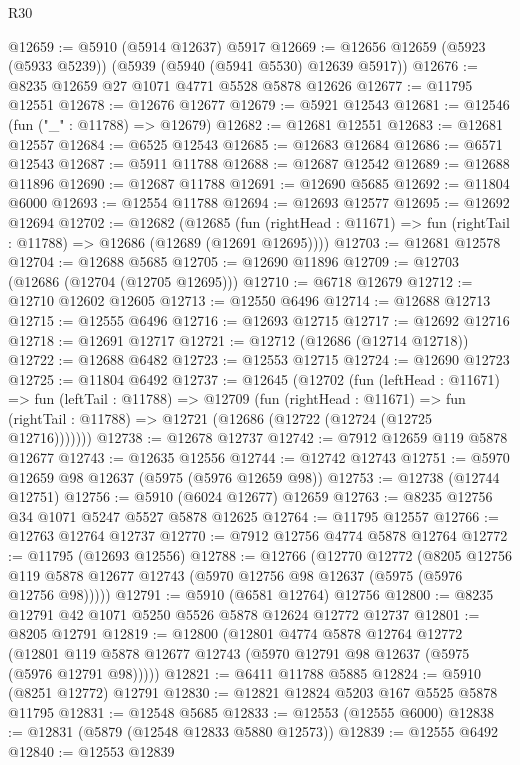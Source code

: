 \begin{lexlean}{R30}
\begin{coremodule}
@12659 := @5910 (@5914 @12637) @5917
@12669 := @12656 @12659 (@5923 (@5933 @5239)) (@5939 (@5940 (@5941 @5530) @12639 @5917))
@12676 := @8235 @12659 @27 @1071 @4771 @5528 @5878 @12626
@12677 := @11795 @12551
@12678 := @12676 @12677
@12679 := @5921 @12543
@12681 := @12546 (fun ("_" : @11788) => @12679)
@12682 := @12681 @12551
@12683 := @12681 @12557
@12684 := @6525 @12543
@12685 := @12683 @12684
@12686 := @6571 @12543
@12687 := @5911 @11788
@12688 := @12687 @12542
@12689 := @12688 @11896
@12690 := @12687 @11788
@12691 := @12690 @5685
@12692 := @11804 @6000
@12693 := @12554 @11788
@12694 := @12693 @12577
@12695 := @12692 @12694
@12702 := @12682
    (@12685
      (fun (rightHead : @11671) => fun (rightTail : @11788) => @12686 (@12689 (@12691 @12695))))
@12703 := @12681 @12578
@12704 := @12688 @5685
@12705 := @12690 @11896
@12709 := @12703 (@12686 (@12704 (@12705 @12695)))
@12710 := @6718 @12679
@12712 := @12710 @12602 @12605
@12713 := @12550 @6496
@12714 := @12688 @12713
@12715 := @12555 @6496
@12716 := @12693 @12715
@12717 := @12692 @12716
@12718 := @12691 @12717
@12721 := @12712 (@12686 (@12714 @12718))
@12722 := @12688 @6482
@12723 := @12553 @12715
@12724 := @12690 @12723
@12725 := @11804 @6492
@12737 := @12645
    (@12702
      (fun (leftHead : @11671) =>
      fun (leftTail : @11788) =>
      @12709
        (fun (rightHead : @11671) =>
        fun (rightTail : @11788) => @12721 (@12686 (@12722 (@12724 (@12725 @12716)))))))
@12738 := @12678 @12737
@12742 := @7912 @12659 @119 @5878 @12677
@12743 := @12635 @12556
@12744 := @12742 @12743
@12751 := @5970 @12659 @98 @12637 (@5975 (@5976 @12659 @98))
@12753 := @12738 (@12744 @12751)
@12756 := @5910 (@6024 @12677) @12659
@12763 := @8235 @12756 @34 @1071 @5247 @5527 @5878 @12625
@12764 := @11795 @12557
@12766 := @12763 @12764 @12737
@12770 := @7912 @12756 @4774 @5878 @12764
@12772 := @11795 (@12693 @12556)
@12788 := @12766
    (@12770
      @12772
      (@8205 @12756 @119 @5878 @12677 @12743 (@5970 @12756 @98 @12637 (@5975 (@5976 @12756 @98)))))
@12791 := @5910 (@6581 @12764) @12756
@12800 := @8235 @12791 @42 @1071 @5250 @5526 @5878 @12624 @12772 @12737
@12801 := @8205 @12791
@12819 := @12800
    (@12801
      @4774
      @5878
      @12764
      @12772
      (@12801 @119 @5878 @12677 @12743 (@5970 @12791 @98 @12637 (@5975 (@5976 @12791 @98)))))
@12821 := @6411 @11788 @5885
@12824 := @5910 (@8251 @12772) @12791
@12830 := @12821 @12824 @5203 @167 @5525 @5878 @11795
@12831 := @12548 @5685
@12833 := @12553 (@12555 @6000)
@12838 := @12831 (@5879 (@12548 @12833 @5880 @12573))
@12839 := @12555 @6492
@12840 := @12553 @12839

\end{coremodule}
\end{lexlean}

